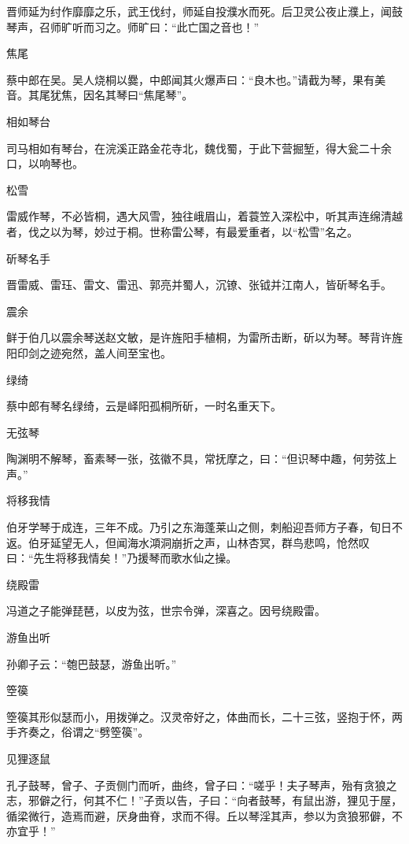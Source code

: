 \documentclass[a4paper,12pt,UTF8,twoside]{ctexbook}
\begin{document}
    晋师延为纣作靡靡之乐，武王伐纣，师延自投濮水而死。后卫灵公夜止濮上，闻鼓琴声，召师旷听而习之。师旷曰：“此亡国之音也！”
    
    焦尾
    
    蔡中郎在吴。吴人烧桐以爨，中郎闻其火爆声曰：“良木也。”请截为琴，果有美音。其尾犹焦，因名其琴曰“焦尾琴”。
    
    相如琴台
    
    司马相如有琴台，在浣溪正路金花寺北，魏伐蜀，于此下营掘堑，得大瓮二十余口，以响琴也。
    
    松雪
    
    雷威作琴，不必皆桐，遇大风雪，独往峨眉山，着蓑笠入深松中，听其声连绵清越者，伐之以为琴，妙过于桐。世称雷公琴，有最爱重者，以“松雪”名之。
    
    斫琴名手
    
    晋雷威、雷珏、雷文、雷迅、郭亮并蜀人，沉镣、张钺并江南人，皆斫琴名手。
    
    震余
    
    鲜于伯几以震余琴送赵文敏，是许旌阳手植桐，为雷所击断，斫以为琴。琴背许旌阳印剑之迹宛然，盖人间至宝也。
    
    绿绮
    
    蔡中郎有琴名绿绮，云是峄阳孤桐所斫，一时名重天下。
    
    无弦琴
    
    陶渊明不解琴，畜素琴一张，弦徽不具，常抚摩之，曰：“但识琴中趣，何劳弦上声。”
    
    将移我情
    
    伯牙学琴于成连，三年不成。乃引之东海蓬莱山之侧，刺船迎吾师方子春，旬日不返。伯牙延望无人，但闻海水澒洞崩折之声，山林杏冥，群鸟悲鸣，怆然叹曰：“先生将移我情矣！”乃援琴而歌水仙之操。
    
    绕殿雷
    
    冯道之子能弹琵琶，以皮为弦，世宗令弹，深喜之。因号绕殿雷。
    
    游鱼出听
    
    孙卿子云：“匏巴鼓瑟，游鱼出听。”
    
    箜篌
    
    箜篌其形似瑟而小，用拨弹之。汉灵帝好之，体曲而长，二十三弦，竖抱于怀，两手齐奏之，俗谓之“劈箜篌”。
    
    见狸逐鼠
    
    孔子鼓琴，曾子、子贡侧门而听，曲终，曾子曰：“嗟乎！夫子琴声，殆有贪狼之志，邪僻之行，何其不仁！”子贡以告，子曰：“向者鼓琴，有鼠出游，狸见于屋，循梁微行，造焉而避，厌身曲脊，求而不得。丘以琴淫其声，参以为贪狼邪僻，不亦宜乎！”
    
\end{document}
